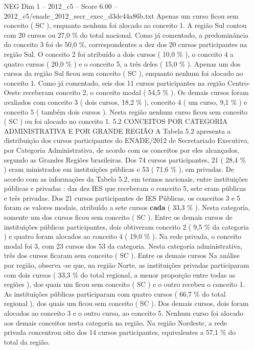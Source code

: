 \begin{textsample}{NEG Dim 1 – 2012\_c5 – Score 6.00 – 2012\_c5/enade\_2012\_secr\_exec\_d3dc44a86b.txt}
Apenas um curso ficou sem conceito ( SC ), enquanto nenhum foi alocado ao conceito 1.
A região Sul contou com 20 cursos ou 27,0 \% do total nacional.
Como já comentado, a predominância do conceito 3 foi de 50,0 \%, correspondentes a dez dos 20 cursos participantes na região Sul.
O conceito 2 foi atribuído a dois cursos ( 10,0 \% ), o conceito 4 a quatro cursos ( 20,0 \% ) e o conceito 5, a três deles ( 15,0 \% ).
Apenas um dos cursos da região Sul ficou sem conceito ( SC ), enquanto nenhum foi alocado ao conceito 1.
Como já comentado, seis dos 11 cursos participantes na região Centro-Oeste receberam conceito 2, o conceito modal ( 54,5 \% ).
Os demais cursos foram avaliados com conceito 3 ( dois cursos, 18,2 \% ), conceito 4 ( um curso, 9,1 \% ) e conceito 5 ( também dois cursos ).
Nesta região nenhum curso ficou sem conceito ( SC ) ou foi alocado no conceito 1. 5.2 CONCEITOS POR CATEGORIA ADMINISTRATIVA E POR GRANDE REGIÃO A Tabela 5.2 apresenta a distribuição dos cursos participantes do ENADE/2012 de Secretariado Executivo, por Categoria Administrativa, de acordo com os conceitos por eles alcançados, segundo as Grandes Regiões brasileiras.
Dos 74 cursos participantes, 21 ( 28,4 \% ) eram ministrados em instituições públicas e 53 ( 71,6 \% ), em privadas.
De acordo com as informações da Tabela 5.2, em termos nacionais, entre instituições públicas e privadas : das dez IES que receberam o conceito 5, sete eram públicas e três privadas.
Dos 21 cursos participantes de IES Públicas, os conceitos 3 e 5 foram os valores modais, atribuído a sete cursos \textbf{cada} ( 33,3 \% ).
Nesta categoria, somente um dos cursos ficou sem conceito ( SC ).
Entre os demais cursos de instituições públicas participantes, dois obtiveram conceito 2 ( 9,5 \% da categoria ) e quatro foram alocados ao conceito 4 ( 19,0 \% ).
Na rede privada, o conceito modal foi 3, com 23 cursos dos 53 da categoria.
Nesta categoria administrativa, três dos cursos ficaram sem conceito ( SC ).
Entre os demais cursos Na análise por região, observa -se que, na região Norte, as instituições privadas participaram com dois cursos ( 33,3 \% do total regional, a menor proporção entre todas as regiões ), dos quais um ficou sem conceito ( SC ) e o outro recebeu o conceito 1.
As instituições públicas participaram com quatro cursos ( 66,7 \% do total regional ), dos quais um ficou sem conceito ( SC ).
Dos demais cursos, dois foram alocados ao conceito 3 e o outro curso, ao conceito 5.
Nenhum curso foi alocado aos demais conceitos nesta categoria na região.
Na região Nordeste, a rede privada concentrou oito dos 14 cursos participantes, equivalentes a 57,1 \% do total da região.

\end{textsample}
